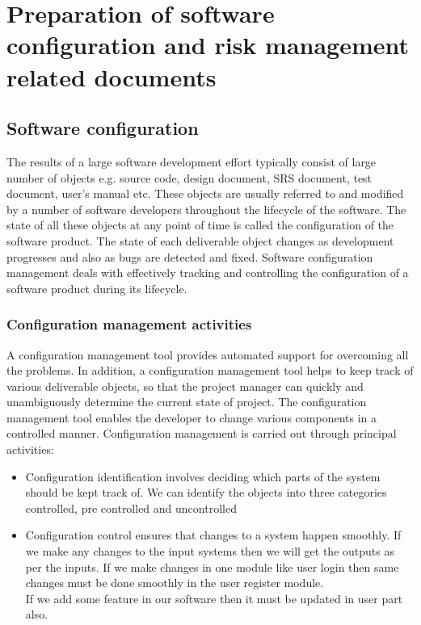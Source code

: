 \chapter{Preparation of software configuration and risk management related documents}
\label{Practical:4}
\section{Software configuration}
The results of a large software development effort typically consist of large number of objects e.g. source code,
design document, SRS document, test document, user’s manual etc. These objects are usually referred to and
modified by a number of software developers throughout the lifecycle of the software. The state of all these
objects at any point of time is called the configuration of the software product. The state of each deliverable
object changes as development progresses and also as bugs are detected and fixed. Software configuration
management deals with effectively tracking and controlling the configuration of a software product during its
lifecycle. 

\subsection{Configuration management activities } 
A configuration management tool provides automated support for overcoming all the problems. In addition, a
configuration management tool helps to keep track of various deliverable objects, so that the project manager
can quickly and unambiguously determine the current state of project. The configuration management tool
enables the developer to change various components in a controlled manner.
Configuration management is carried out through principal activities: 
\begin{itemize}
\item Configuration identification involves deciding which parts of the system should be kept track of. We
can identify the objects into three categories controlled, pre controlled and uncontrolled
\item Configuration control ensures that changes to a system happen smoothly. If we make any changes to
the input systems then we will get the outputs as per the inputs. If we make changes in one module like
user login then same changes must be done smoothly in the user register module.\\ If we add some feature
in our software then it must be updated in user part also.  
 	
\end{itemize}	

